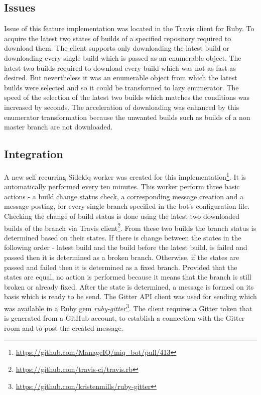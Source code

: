 \subsection{Issues}

Issue of this feature implementation was located in the Travis client for Ruby. To acquire the latest two states of builds of a specified repository required to download them. The client supports only downloading the latest build or downloading every single build which is passed as an enumerable object. The latest two builds required to download every build which was not as fast as desired. But nevertheless it was an enumerable object from which the latest builds were selected and so it could be transformed to lazy enumerator. The speed of the selection of the latest two builds which matches the conditions was increased by seconds. The acceleration of downloading was enhanced by this enumerator transformation because the unwanted builds such as builds of a non master branch are not downloaded.

\subsection{Integration}

A new self recurring Sidekiq worker was created for this implementation\footnote{\url{https://github.com/ManageIQ/miq_bot/pull/413}}. It is automatically performed every ten minutes. This worker perform three basic actions - a build change status check, a corresponding message creation and a message posting, for every single branch specified in the bot's configuration file. Checking the change of build status is done using the latest two downloaded builds of the branch via Travis client\footnote{\url{https://github.com/travis-ci/travis.rb}}. From these two builds the branch status is determined based on their states. If there is change between the states in the following order - latest build and the build before the latest build, is failed and passed then it is determined as a broken branch. Otherwise, if the states are passed and failed then it is determined as a fixed branch. Provided that the states are equal, no action is performed because it means that the branch is still broken or already fixed. After the state is determined, a message is formed on its basis which is ready to be send. The Gitter API client was used for sending which was available in a Ruby gem \textit{ruby-gitter}\footnote{\url{https://github.com/kristenmills/ruby-gitter}}. The client requires a Gitter token that is generated from a GitHub account, to establish a connection with the Gitter room and to post the created message.

